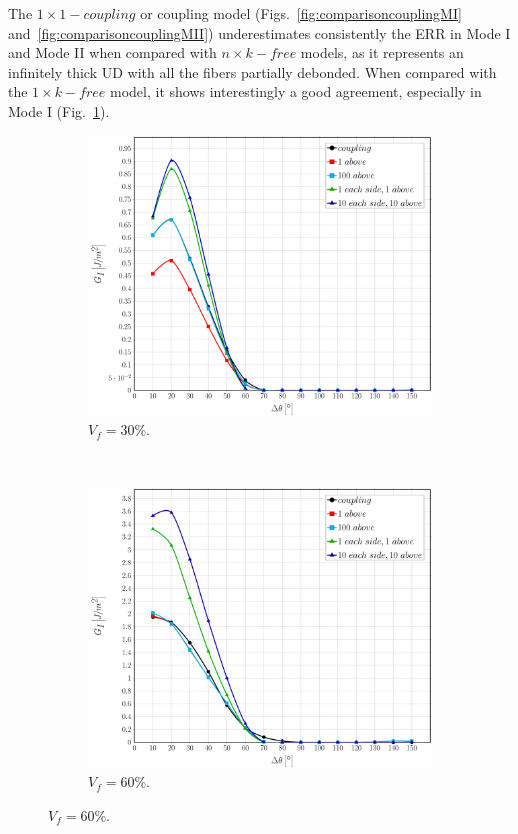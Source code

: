 \documentclass[review]{elsarticle}
\begin{document}
The $1\times 1-coupling$ or coupling model (Figs.~\ref{fig:comparisoncouplingMI} and~\ref{fig:comparisoncouplingMII}) underestimates consistently the ERR in Mode I and Mode II when compared with $n\times k-free$ models, as it represents an infinitely thick UD with all the fibers partially debonded. When compared with the $1\times k-free$ model, it shows interestingly a good agreement, especially in Mode I (Fig.~\ref{subfig:comparisoncoupling30MI}).

\begin{figure}[!h]
\centering
    \begin{subfigure}[b]{0.475\textwidth}
        \includegraphics[width=\textwidth]{comparecouplingabovesidefibers-vf30-GI.pdf}
        \caption{$V_{f}=30\%$.}\label{subfig:comparisoncoupling30MI}
    \end{subfigure} ~
    \begin{subfigure}[b]{0.475\textwidth}
        \includegraphics[width=\textwidth]{comparecouplingabovesidefibers-vf60-GI.pdf}
        \caption{$V_{f}=60\%$.}\label{subfig:comparisoncoupling60MI}
    \end{subfigure}


\end{figure}
\end{document}
